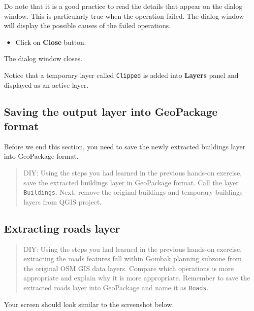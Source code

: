 \documentclass[
  letterpaper,
  DIV=11,
  numbers=noendperiod]{scrreprt}
\providecommand{\tightlist}{%
  \setlength{\itemsep}{0pt}\setlength{\parskip}{0pt}}\usepackage{longtable,booktabs,array}
\begin{document}
Do note that it is a good practice to read the details that appear on
the dialog window. This is particularly true when the operation failed.
The dialog window will display the possible causes of the failed
operations.

\begin{itemize}
\tightlist
\item
  Click on \textbf{Close} button.
\end{itemize}

The dialog window closes.

Notice that a temporary layer called \texttt{Clipped} is added into
\textbf{Layers} panel and displayed as an active layer.

\hypertarget{saving-the-output-layer-into-geopackage-format}{%
\subsection{Saving the output layer into GeoPackage
format}\label{saving-the-output-layer-into-geopackage-format}}

Before we end this section, you need to save the newly extracted
buildings layer into GeoPackage format.

\begin{quote}
DIY: Using the steps you had learned in the previous hands-on exercise,
save the extracted buildings layer in GeoPackage format. Call the layer
\texttt{Buildings}. Next, remove the original buildings and temporary
buildings layers from QGIS project.
\end{quote}

\hypertarget{extracting-roads-layer}{%
\subsection{Extracting roads layer}\label{extracting-roads-layer}}

\begin{quote}
DIY: Using the steps you had learned in the previous hands-on exercise,
extracting the roads features fall within Gombak planning subzone from
the original OSM GIS data layers. Compare which operations is more
appropriate and explain why it is more appropriate. Remember to save the
extracted roads layer into GeoPackage and name it as \texttt{Roads}.
\end{quote}

Your screen should look similar to the screenshot below.
\end{document}
